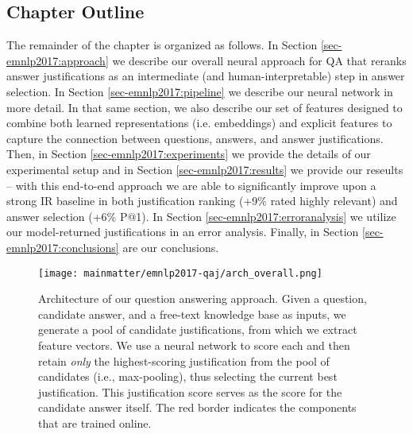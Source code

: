 \subsection{Chapter Outline}
The remainder of the chapter is organized as follows.  In Section \ref{sec-emnlp2017:approach} we describe our overall neural approach for QA that reranks answer justifications as an intermediate (and human-interpretable) step in answer selection. In Section \ref{sec-emnlp2017:pipeline} we describe our neural network in more detail.  In that same section, we also describe our set of features designed to combine both learned representations (i.e. embeddings) and explicit features to capture the connection between questions, answers, and answer justifications.  Then, in Section \ref{sec-emnlp2017:experiments} we provide the details of our experimental setup and in Section \ref{sec-emnlp2017:results} we provide our reseults -- with this end-to-end approach we are able to significantly improve upon a strong IR baseline in both justification ranking (+9\% rated highly relevant) and answer selection (+6\% P@1).  In Section \ref{sec-emnlp2017:erroranalysis} we utilize our model-returned justifications in an error analysis.  Finally, in Section \ref{sec-emnlp2017:conclusions} are our conclusions.




\begin{figure}[t]
\begin{center}
\texttt{[image: mainmatter/emnlp2017-qaj/arch\_overall.png]}
\caption{ Architecture of our question answering approach.  
Given a question, candidate answer, and a free-text knowledge base as inputs, we generate a pool of candidate justifications, from which we extract feature vectors.  We use a neural network to score each and then retain \textit{only} the highest-scoring justification from the pool of candidates (i.e., max-pooling), thus selecting the current best justification. This justification score serves as the score for the candidate answer itself.  The red border indicates the components that are trained online. }
\label{fig:arch_overall}
\end{center}
\end{figure}

